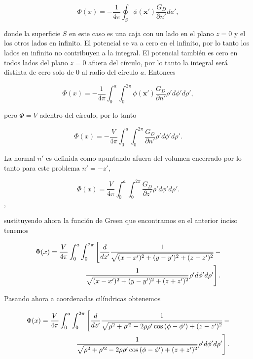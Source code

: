 \documentclass[a4paper,10pt]{article}
\numberwithin{equation}{section}
\newcommand{\zerodel}{.\kern-\nulldelimiterspace}
\begin{document}
\begin{equation}
  \Phi(x) = - \frac{1}{4\pi}\oint_S \phi(\mathbf{x}')\frac{G_D}{\partial n'}da',
\end{equation}

donde la superficie $S$ en este caso es una caja con un lado en el plano $z=0$ y el los 
otros lados en infinito. El potencial se va a cero en el infinito, por lo tanto los 
lados en infinito no contribuyen a la integral. El potencial también es cero en todos 
lados del plano $z=0$ afuera del círculo, por lo tanto la integral será distinta de 
cero solo de $0$ al radio del círculo $a$. Entonces 

\begin{equation}
 \Phi(x) = - \frac{1}{4\pi}\int_0^a \int_0^{2\pi} \phi(\mathbf{x}')\frac{G_D}{\partial n'}
 \rho'd\phi'd\rho',
\end{equation}

pero $\Phi = V$ adentro del círculo, por lo tanto 

\begin{equation}
 \Phi(x) = - \frac{V}{4\pi}\int_0^a \int_0^{2\pi} \frac{G_D}{\partial n'}
 \rho'd\phi'd\rho'.
\end{equation}

La normal $n'$ es definida como apuntando afuera del volumen encerrado por lo tanto 
para este problema $n' = -z'$, 

\begin{equation}
 \Phi(x) = \frac{V}{4\pi}\int_0^a \int_0^{2\pi} \frac{G_D}{\partial z'}
 \rho'd\phi'd\rho'.
\end{equation},

sustituyendo ahora la función de Green que encontramos en el anterior inciso tenemos 

\begin{align*}
  \Phi(x) = \frac{V}{4\pi}\int_0^a \int_0^{2\pi}\left[ \frac{d}{dz'}
  \frac{1}{\sqrt{(x-x')^2 + (y-y')^2 + (z-z')^2}}\right\zerodel - \\
 \left\zerodel\frac{1}{\sqrt{(x-x')^2 + (y-y')^2 + (z+z')^2}}
 \rho'd\phi'd\rho'\right].
\end{align*}

Pasando ahora a coordenadas cilíndricas obtenemos 

\begin{align*}
 \Phi(x) = \frac{V}{4\pi}\int_0^a \int_0^{2\pi}\left[ \frac{d}{dz'}
  \frac{1}{\sqrt{\rho^2 + \rho'^2 - 2\rho\rho'\cos{(\phi - \phi')} + (z-z')^2}}\right\zerodel - \\
 \left\zerodel\frac{1}{\sqrt{\rho^2 + \rho'^2 - 2\rho\rho'\cos{(\phi - \phi')} + (z+z')^2}}
 \rho'd\phi'd\rho'\right].
\end{align*}
\end{document}
